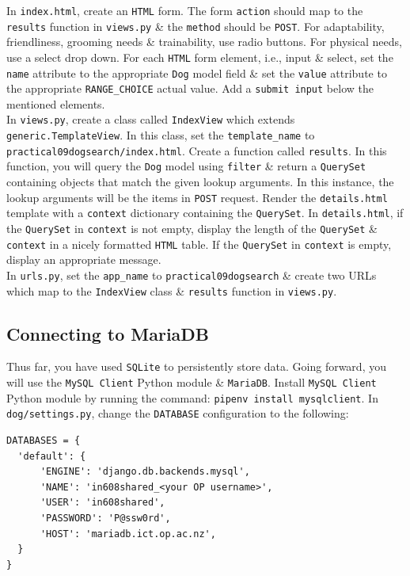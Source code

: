 \documentclass{article}
\begin{document}
In \texttt{index.html}, create an \texttt{HTML} form. The form \texttt{action} should map to the \texttt{results} function in \texttt{views.py} \& the \texttt{method} should be \texttt{POST}. For adaptability, friendliness, grooming needs \& trainability, use radio buttons. For physical needs, use a select drop down. For each \texttt{HTML} form element, i.e., input \& select, set the \texttt{name} attribute to the appropriate \texttt{Dog} model field \& set the \texttt{value} attribute to the appropriate \texttt{RANGE\_CHOICE} actual value. Add a \texttt{submit input} below the mentioned elements. \\

In \texttt{views.py}, create a class called \texttt{IndexView} which extends \texttt{generic.TemplateView}. In this class, set the \texttt{template\_name} to \texttt{practical09dogsearch/index.html}. Create a function called \texttt{results}. In this function, you will query the \texttt{Dog} model using \texttt{filter} \& return a \texttt{QuerySet} containing objects that match the given lookup arguments. In this instance, the lookup arguments will be the items in \texttt{POST} request. Render the \texttt{details.html} template with a \texttt{context} dictionary containing the \texttt{QuerySet}. In \texttt{details.html}, if the \texttt{QuerySet} in \texttt{context} is not empty, display the length of the \texttt{QuerySet} \& \texttt{context} in a nicely formatted \texttt{HTML} table. If the \texttt{QuerySet} in \texttt{context} is empty, display an appropriate message. \\

In \texttt{urls.py}, set the \texttt{app\_name} to \texttt{practical09dogsearch} \& create two URLs which map to the \texttt{IndexView} class \& \texttt{results} function in \texttt{views.py}.

\subsection*{Connecting to MariaDB}
Thus far, you have used \texttt{SQLite} to persistently store data. Going forward, you will use the \texttt{MySQL Client} Python module \& \texttt{MariaDB}. Install \texttt{MySQL Client} Python module by running the command: \texttt{pipenv install mysqlclient}. In \texttt{dog/settings.py}, change the \texttt{DATABASE} configuration to the following:

\begin{verbatim}
DATABASES = {
  'default': {
      'ENGINE': 'django.db.backends.mysql',
      'NAME': 'in608shared_<your OP username>', 
      'USER': 'in608shared', 
      'PASSWORD': 'P@ssw0rd',
      'HOST': 'mariadb.ict.op.ac.nz',
  }
}
\end{verbatim}
\end{document}
